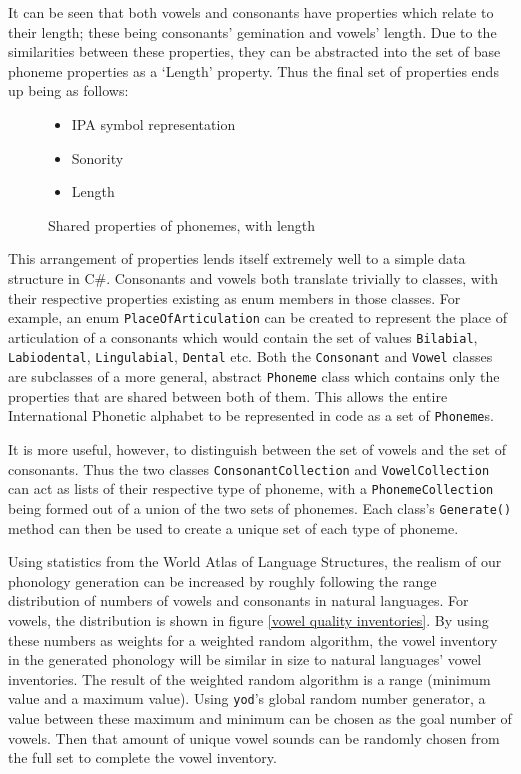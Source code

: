 \documentclass{report}
\newcommand{\Csh}{C{\lserif\#}}
\begin{document}
	It can be seen that both vowels and consonants have properties which relate to their length; these being consonants' gemination and vowels' length. Due to the similarities between these properties, they can be abstracted into the set of base phoneme properties as a `Length' property. Thus the final set of properties ends up being as follows:

	\begin{figure}[h]
	\caption{Shared properties of phonemes, with length}
	\label{shared properties of phonemes with length}
	\begin{tcolorbox}
		\begin{itemize}
			\item IPA symbol representation
			\item Sonority
			\item Length
		\end{itemize}
	\end{tcolorbox}
	\end{figure}

	This arrangement of properties lends itself extremely well to a simple data structure in \Csh{}. Consonants and vowels both translate trivially to classes, with their respective properties existing as enum members in those classes. For example, an enum \texttt{PlaceOfArticulation} can be created to represent the place of articulation of a consonants which would contain the set of values \texttt{Bilabial}, \texttt{Labiodental}, \texttt{Lingulabial}, \texttt{Dental} etc. Both the \texttt{Consonant} and \texttt{Vowel} classes are subclasses of a more general, abstract \texttt{Phoneme} class which contains only the properties that are shared between both of them. This allows the entire International Phonetic alphabet to be represented in code as a set of \texttt{Phoneme}s.
	
	It is more useful, however, to distinguish between the set of vowels and the set of consonants. Thus the two classes \texttt{ConsonantCollection} and \texttt{VowelCollection} can act as lists of their respective type of phoneme, with a \texttt{PhonemeCollection} being formed out of a union of the two sets of phonemes. Each class's \texttt{Generate()} method can then be used to create a unique set of each type of phoneme.
	
	Using statistics from the World Atlas of Language Structures, the realism of our phonology generation can be increased by roughly following the range distribution of numbers of vowels and consonants in natural languages. For vowels, the distribution is shown in figure \ref{vowel quality inventories}. By using these numbers as weights for a weighted random algorithm, the vowel inventory in the generated phonology will be similar in size to natural languages' vowel inventories. The result of the weighted random algorithm is a range (minimum value and a maximum value). Using \texttt{yod}'s global random number generator, a value between these maximum and minimum can be chosen as the goal number of vowels. Then that amount of unique vowel sounds can be randomly chosen from the full set to complete the vowel inventory.
	
\end{document}
